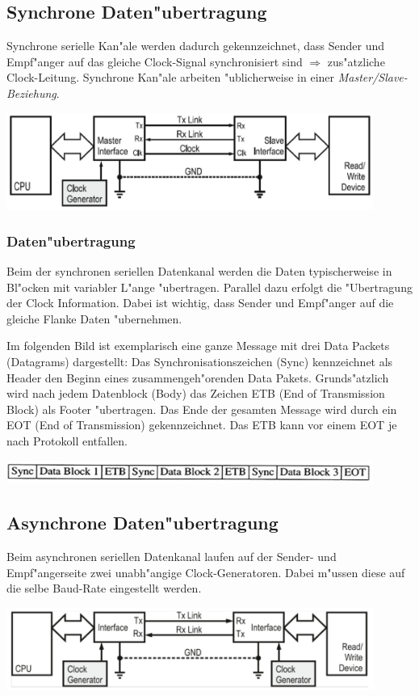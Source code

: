 \newpage
\subsection{Synchrone Daten"ubertragung}
Synchrone serielle Kan"ale werden dadurch gekennzeichnet, dass Sender und Empf"anger auf das gleiche Clock-Signal synchronisiert sind $\Rightarrow$ zus"atzliche Clock-Leitung. Synchrone Kan"ale arbeiten "ublicherweise in einer \textit{Master/Slave-Beziehung}.\\
	\begin{center}
		\includegraphics[width=12cm]{images/synch_full_duplex}
	\end{center}
	
\subsubsection{Daten"ubertragung}
Beim der synchronen seriellen Datenkanal werden die Daten typischerweise in Bl"ocken mit variabler L"ange "ubertragen. Parallel dazu erfolgt die "Ubertragung der Clock Information. Dabei ist wichtig, dass Sender und Empf"anger auf die gleiche Flanke Daten "ubernehmen.

Im folgenden Bild ist exemplarisch eine ganze Message mit drei Data Packets (Datagrams) dargestellt: Das Synchronisationszeichen (Sync) kennzeichnet als Header den Beginn eines zusammengeh"orenden Data Pakets. Grunds"atzlich wird nach jedem Datenblock (Body) das Zeichen ETB (End of Transmission Block) als Footer "ubertragen. Das Ende der gesamten Message wird durch ein EOT (End of Transmission) gekennzeichnet. Das ETB kann vor einem EOT je nach Protokoll entfallen.
	\begin{center}
		\includegraphics[width=12cm]{images/synch-serielle-data-bsp}
	\end{center}

\subsection{Asynchrone Daten"ubertragung}
Beim asynchronen seriellen Datenkanal laufen auf der Sender- und Empf"angerseite zwei unabh"angige Clock-Generatoren. Dabei m"ussen diese auf die selbe Baud-Rate eingestellt werden. 
	\begin{center}
		\includegraphics[width=12cm]{images/asynch_serial.png}
	\end{center}

